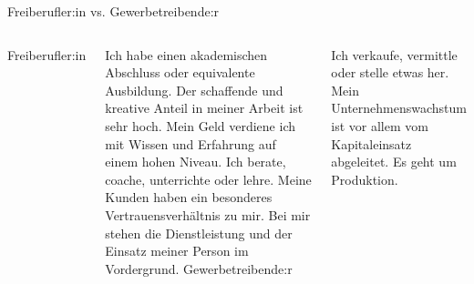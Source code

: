 
\begin{frame}{Freiberufler:in vs. Gewerbetreibende:r}
\begin{columns}
  Freiberufler:in

  Ich habe einen akademischen Abschluss oder equivalente Ausbildung. Der schaffende und kreative Anteil in meiner Arbeit ist sehr hoch. Mein Geld verdiene ich mit Wissen und Erfahrung auf einem hohen Niveau. Ich berate, coache, unterrichte oder lehre. Meine Kunden haben ein besonderes Vertrauensverhältnis zu mir. Bei mir stehen die Dienstleistung und der Einsatz meiner Person im Vordergrund.
  Gewerbetreibende:r

  Ich verkaufe, vermittle oder stelle etwas her. Mein Unternehmenswachstum ist vor allem vom Kapitaleinsatz abgeleitet. Es geht um Produktion.
\end{columns}
\end{frame}
